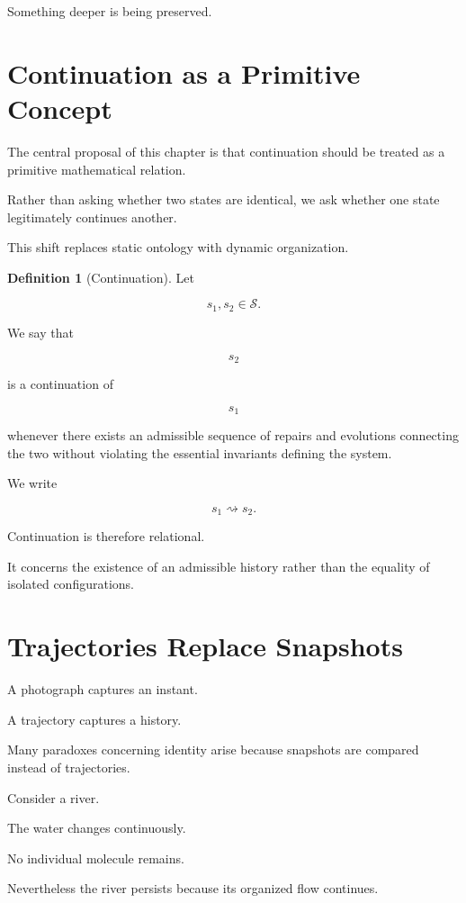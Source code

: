\documentclass[11pt,oneside]{book}
\numberwithin{equation}{chapter}
\theoremstyle{definition}
\newtheorem{definition}{Definition}[chapter]
\theoremstyle{plain}
\newcommand{\State}{\mathcal{S}}
\begin{document}
Something deeper is being preserved.

\section{Continuation as a Primitive Concept}

The central proposal of this chapter is that continuation should be treated
as a primitive mathematical relation.

Rather than asking whether two states are identical, we ask whether one
state legitimately continues another.

This shift replaces static ontology with dynamic organization.

\begin{definition}[Continuation]

Let

\[
s_1,s_2\in\State.
\]

We say that

\[
s_2
\]

is a continuation of

\[
s_1
\]

whenever there exists an admissible sequence of repairs and evolutions
connecting the two without violating the essential invariants defining the
system.

We write

\[
s_1 \rightsquigarrow s_2.
\]

\end{definition}

Continuation is therefore relational.

It concerns the existence of an admissible history rather than the equality
of isolated configurations.

\section{Trajectories Replace Snapshots}

A photograph captures an instant.

A trajectory captures a history.

Many paradoxes concerning identity arise because snapshots are compared
instead of trajectories.

Consider a river.

The water changes continuously.

No individual molecule remains.

Nevertheless the river persists because its organized flow continues.
\end{document}
